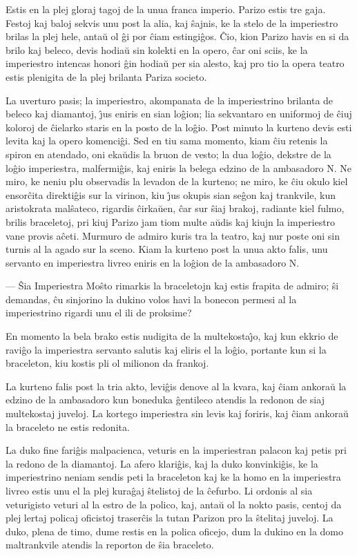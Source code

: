 
   Estis en la plej gloraj tagoj de la unua franca imperio. Parizo estis
tre gaja. Festoj kaj baloj sekvis unu post la alia, kaj \^sajnis, ke
la stelo de la imperiestro brilas la plej hele, anta\u u ol \^gi por
\^ciam estingi\^gos. \^Cio, kion Parizo havis en si da brilo kaj
beleco, devis hodia\u u sin kolekti en la opero, \^car oni sciis, ke
la imperiestro intencas honori \^gin hodia\u u per sia alesto, kaj
pro tio la opera teatro estis plenigita de la plej brilanta Pariza
societo.

   La uverturo pasis; la imperiestro, akompanata de la imperiestrino
brilanta de beleco kaj diamantoj, \^{\j}us eniris en sian lo\^gion;
lia sekvantaro en uniformoj de \^ciuj koloroj de \^cielarko staris
en la posto de la lo\^gio. Post minuto la kurteno devis esti levita
kaj la opero komenci\^gi. Sed en tiu sama momento, kiam \^ciu
retenis la spiron en atendado, oni eka\u udis la bruon de vesto; la
dua lo\^gio, dekstre de la lo\^gio imperiestra, malfermi\^gis, kaj
eniris la belega edzino de la ambasadoro N. Ne miro, ke neniu plu
observadis la levadon de la kurteno; ne miro, ke \^ciu okulo kiel
ensor\^cita direkti\^gis sur la virinon, kiu \^{\j}us okupis sian
se\^gon kaj trankvile, kun aristokrata mal\^sateco, rigardis
\^cirka\u uen, \^car sur \^siaj brakoj, radiante kiel fulmo, brilis
braceletoj, pri kiuj Parizo jam tiom multe a\u udis kaj kiujn la
imperiestro vane provis a\^ceti. Murmuro de admiro kuris tra la
teatro, kaj nur poste oni sin turnis al la agado sur la sceno. Kiam
la kurteno post la unua akto falis, unu servanto en imperiestra
livreo eniris en la lo\^gion de la ambasadoro N.

 --- \^Sia Imperiestra Mo\^sto rimarkis la braceletojn kaj estis frapita
de admiro; \^si demandas, \^cu sinjorino la dukino volos havi la
bonecon permesi al la imperiestrino rigardi unu el ili de proksime?

   En momento la bela brako estis nudigita de la multekosta\^{\j}o, kaj
kun ekkrio de ravi\^go la imperiestra servanto salutis kaj eliris el
la lo\^gio, portante kun si la braceleton, kiu kostis pli ol
milionon da frankoj.

   La kurteno falis post la tria akto, levi\^gis denove al la kvara,
kaj \^ciam ankora\u u la edzino de la ambasadoro kun boneduka
\^gentileco atendis la redonon de siaj multekostaj juveloj. La
kortego imperiestra sin levis kaj foriris, kaj \^ciam ankora\u u la
braceleto ne estis redonita.

   La duko fine fari\^gis malpacienca, veturis en la imperiestran palacon
kaj petis pri la redono de la diamantoj. La afero klari\^gis, kaj la
duko konvinki\^gis, ke la imperiestrino neniam sendis peti la
braceleton kaj ke la homo en la imperiestra livreo estis unu el la
plej kura\^gaj \^stelistoj de la \^cefurbo. Li ordonis al sia
veturigisto veturi al la estro de la polico, kaj, anta\u u ol la
nokto pasis, centoj da plej lertaj policaj oficistoj traser\^cis la
tutan Parizon pro la \^stelitaj juveloj. La duko, plena de timo,
dume restis en la polica oficejo, dum la dukino en la domo
maltrankvile atendis la reporton de \^sia braceleto.

